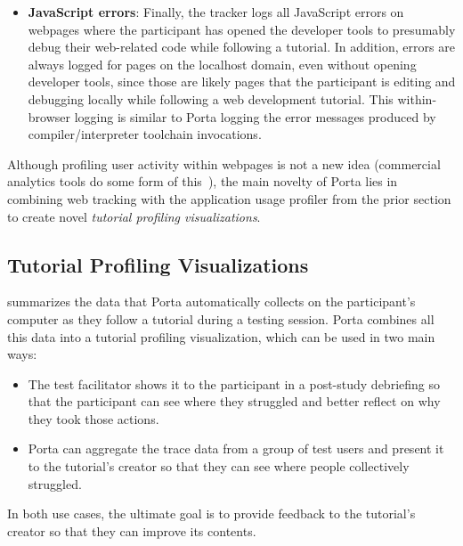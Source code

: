 \begin{itemize}
        \item \textbf{JavaScript errors}: Finally, the tracker logs all
        JavaScript errors on webpages where the participant has opened
        the developer tools to presumably debug their web-related code
        while following a tutorial. In addition, errors are always
        logged for pages on the localhost domain, even without opening
        developer tools, since those are likely pages that the
        participant is editing and debugging locally while following a
        web development tutorial. This within-browser logging is similar
        to Porta logging the error messages produced by
        compiler/interpreter toolchain invocations.

\end{itemize}

Although profiling user activity within webpages is not a new idea
(commercial analytics tools do some form of this~\cite{fullstory,hotjar,mouseflow}), the
main novelty of Porta lies in combining web tracking with the
application usage profiler from the prior section to create novel
\emph{tutorial profiling visualizations}.


\subsection{Tutorial Profiling Visualizations}



 summarizes the data that Porta automatically collects
on the participant's computer as they follow a tutorial during a testing
session. Porta combines all this data into a tutorial profiling
visualization, which can be used in two main ways:

\begin{itemize} \itemsep0pt

\item The test facilitator shows it to the participant in a post-study
debriefing so that the participant can see where they struggled and
better reflect on why they took those actions.

\item Porta can aggregate the trace data from a group of test users and
present it to the tutorial's creator so that they can see where people
collectively struggled.

\end{itemize}

In both use cases, the ultimate goal is to provide feedback to the
tutorial's creator so that they can improve its contents.


